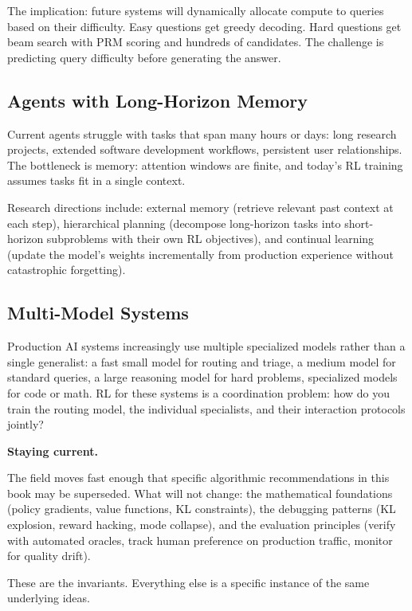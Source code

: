 \begin{chapterenv}
The implication: future systems will dynamically allocate compute to queries based on their difficulty. Easy questions get greedy decoding. Hard questions get beam search with PRM scoring and hundreds of candidates. The challenge is predicting query difficulty before generating the answer.

\subsection{Agents with Long-Horizon Memory}

Current agents struggle with tasks that span many hours or days: long research projects, extended software development workflows, persistent user relationships. The bottleneck is memory: attention windows are finite, and today's RL training assumes tasks fit in a single context.

Research directions include: external memory (retrieve relevant past context at each step), hierarchical planning (decompose long-horizon tasks into short-horizon subproblems with their own RL objectives), and continual learning (update the model's weights incrementally from production experience without catastrophic forgetting).

\subsection{Multi-Model Systems}

Production AI systems increasingly use multiple specialized models rather than a single generalist: a fast small model for routing and triage, a medium model for standard queries, a large reasoning model for hard problems, specialized models for code or math. RL for these systems is a coordination problem: how do you train the routing model, the individual specialists, and their interaction protocols jointly?

\begin{tipbox}
\textbf{Staying current.}

The field moves fast enough that specific algorithmic recommendations in this book may be superseded. What will not change: the mathematical foundations (policy gradients, value functions, KL constraints), the debugging patterns (KL explosion, reward hacking, mode collapse), and the evaluation principles (verify with automated oracles, track human preference on production traffic, monitor for quality drift).

These are the invariants. Everything else is a specific instance of the same underlying ideas.
\end{tipbox}


\end{chapterenv}
